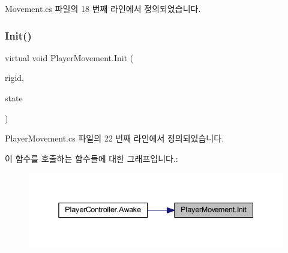 Movement.\+cs 파일의 18 번째 라인에서 정의되었습니다.


\begin{DoxyCode}{0}

\end{DoxyCode}
\mbox{\label{class_player_movement_a104a453051ca7b60d6862e4deb7475b4}} 
\subsubsection{\texorpdfstring{Init()}{Init()}\hspace{0.1cm}{\footnotesize\ttfamily [2/2]}}
{\footnotesize\ttfamily virtual void Player\+Movement.\+Init (\begin{DoxyParamCaption}\item[{Rigidbody2D}]{rigid,  }\item[{\mbox{\hyperlink{class_player_state}{Player\+State}}}]{state }\end{DoxyParamCaption})\hspace{0.3cm}{\ttfamily [virtual]}}



Player\+Movement.\+cs 파일의 22 번째 라인에서 정의되었습니다.


\begin{DoxyCode}{0}

\end{DoxyCode}
이 함수를 호출하는 함수들에 대한 그래프입니다.\+:\nopagebreak
\begin{figure}[H]
\begin{center}
\leavevmode
\includegraphics[width=338pt]{d0/d3d/class_player_movement_a104a453051ca7b60d6862e4deb7475b4_icgraph}
\end{center}
\end{figure}
\mbox{\label{class_player_movement_a347d6bcd5389bbc6b115c2bdf33e8f29}} 
